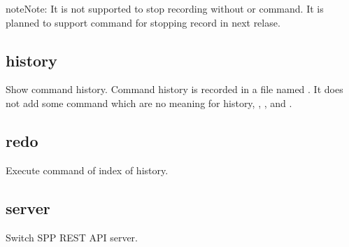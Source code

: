 \documentclass[a4paper,11pt,openany,oneside,english]{sphinxmanual}
\begin{document}
\begin{sphinxVerbatim}[commandchars=\\\{\},formatcom=\footnotesize]
\end{sphinxVerbatim}

\begin{sphinxadmonition}{note}{Note:}
It is not supported to stop recording without  or 
command.
It is planned to support  command for stopping record in
next relase.
\end{sphinxadmonition}


\subsection{history}
\label{\detokenize{commands/common:history}}\label{\detokenize{commands/common:commands-common-history}}
Show command history. Command history is recorded in a file named
. It does not add some command which are no
meaning for history, , ,  and .

\begin{sphinxVerbatim}[commandchars=\\\{\},formatcom=\footnotesize]
\end{sphinxVerbatim}


\subsection{redo}
\label{\detokenize{commands/common:redo}}\label{\detokenize{commands/common:commands-common-redo}}
Execute command of index of history.

\begin{sphinxVerbatim}[commandchars=\\\{\},formatcom=\footnotesize]
\end{sphinxVerbatim}


\subsection{server}
\label{\detokenize{commands/common:server}}\label{\detokenize{commands/common:commands-common-server}}
Switch SPP REST API server.
\end{document}

